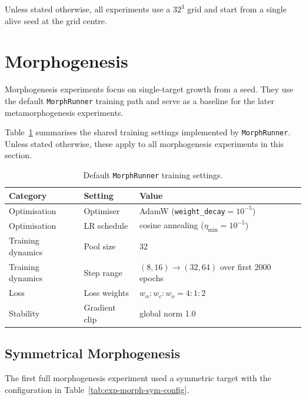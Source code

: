 Unless stated otherwise, all experiments use a $32^3$ grid and start from a
single alive seed at the grid centre.

\clearpage

\section{Morphogenesis}

Morphogenesis experiments focus on single-target growth from a seed. They use
the default \texttt{MorphRunner} training path and serve as a baseline for the
later metamorphogenesis experiments.

Table~\ref{tab:exp-morph-runner-defaults} summarises the shared training
settings implemented by \texttt{MorphRunner}. Unless stated otherwise, these
apply to all morphogenesis experiments in this section.

\begin{table}[htbp]
    \centering
    \small
    {\setlength{\tabcolsep}{4pt}
    \begin{tabular}{@{}p{}p{}p{}@{}}
        \hline
        \textbf{Category} & \textbf{Setting} & \textbf{Value}\\
        \hline
        Optimisation & Optimiser & AdamW (\texttt{weight\_decay}$=10^{-5}$)\\
        Optimisation & LR schedule & cosine annealing
                                     ($\eta_{\min}=10^{-5}$)\\
        Training dynamics & Pool size & 32\\
        Training dynamics & Step range &
            $(8,16)\rightarrow(32,64)$ over first 2000 epochs\\
        Loss & Loss weights & $w_{\alpha}:w_{c}:w_{o}=4{:}1{:}2$\\
        Stability & Gradient clip & global norm 1.0\\
        \hline
    \end{tabular}}
    \caption{Default \texttt{MorphRunner} training settings.}
    \label{tab:exp-morph-runner-defaults}
\end{table}

\subsection{Symmetrical Morphogenesis}

The first full morphogenesis experiment used a symmetric target with the
configuration in Table~\ref{tab:exp-morph-sym-config}.

